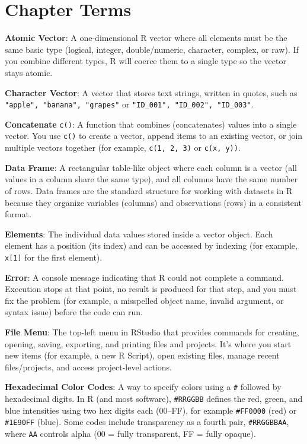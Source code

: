 \documentclass[
  12pt,
]{scrreprt}
\begin{document}
\chapter{Chapter Terms}\label{chapter-terms}

\textbf{Atomic Vector}: A one-dimensional R vector where all elements
must be the same basic type (logical, integer, double/numeric,
character, complex, or raw). If you combine different types, R will
coerce them to a single type so the vector stays atomic.

\textbf{Character Vector}: A vector that stores text strings, written in
quotes, such as \texttt{"apple",\ "banana",\ "grapes"} or
\texttt{"ID\_001",\ "ID\_002",\ "ID\_003"}.

\textbf{Concatenate} \texttt{c()}: A function that combines
(concatenates) values into a single vector. You use \texttt{c()} to
create a vector, append items to an existing vector, or join multiple
vectors together (for example, \texttt{c(1,\ 2,\ 3)} or
\texttt{c(x,\ y))}.

\textbf{Data Frame}: A rectangular table-like object where each column
is a vector (all values in a column share the same type), and all
columns have the same number of rows. Data frames are the standard
structure for working with datasets in R because they organize variables
(columns) and observations (rows) in a consistent format.

\textbf{Elements}: The individual data values stored inside a vector
object. Each element has a position (its index) and can be accessed by
indexing (for example, \texttt{x{[}1{]}} for the first element).

\textbf{Error}: A console message indicating that R could not complete a
command. Execution stops at that point, no result is produced for that
step, and you must fix the problem (for example, a misspelled object
name, invalid argument, or syntax issue) before the code can run.

\textbf{File Menu}: The top-left menu in RStudio that provides commands
for creating, opening, saving, exporting, and printing files and
projects. It's where you start new items (for example, a new R Script),
open existing files, manage recent files/projects, and access
project-level actions.

\textbf{Hexadecimal Color Codes}: A way to specify colors using a
\texttt{\#} followed by hexadecimal digits. In R (and most software),
\texttt{\#RRGGBB} defines the red, green, and blue intensities using two
hex digits each (00--FF), for example \texttt{\#FF0000} (red) or
\texttt{\#1E90FF} (blue). Some codes include transparency as a fourth
pair, \texttt{\#RRGGBBAA}, where \texttt{AA} controls alpha (00 = fully
transparent, FF = fully opaque).
\end{document}
